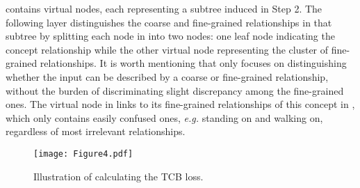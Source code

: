 \documentclass[letterpaper]{article} \usepackage{aaai21}  \usepackage{times}  \usepackage{helvet} \usepackage{courier}  \usepackage[hyphens]{url}  \usepackage{graphicx} \urlstyle{rm} \def\UrlFont{\rm}  \usepackage{natbib}  \usepackage{caption} \frenchspacing  \setlength{\pdfpagewidth}{8.5in}  \setlength{\pdfpageheight}{11in}  \usepackage{amsmath,amsthm}
\begin{document}
contains  virtual nodes, each representing a subtree induced in Step 2. The following  layer distinguishes the coarse and fine-grained relationships in that subtree by splitting each node in  into two nodes: one leaf node indicating the concept relationship while the other virtual node representing the cluster of fine-grained relationships. It is worth mentioning that  only focuses on distinguishing whether the input can be described by a coarse or fine-grained  relationship, without the burden of discriminating slight discrepancy  among  the  fine-grained  ones. The virtual node in  links to its fine-grained relationships of this concept in , which only contains easily confused ones, \textit{e.g.} {\ttfamily standing on} and {\ttfamily walking on}, regardless of most irrelevant relationships.
\begin{figure}[t]
    \centering
    \texttt{[image: Figure4.pdf]}
    \caption{Illustration of calculating the TCB loss.}
    \label{fig:treeloss}
\end{figure}
\end{document}
